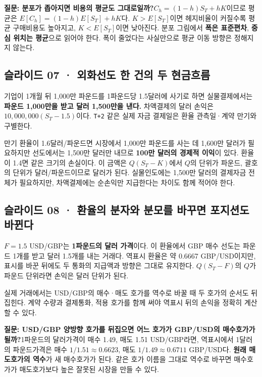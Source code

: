 \documentclass[11pt,a4paper]{article}
\begin{document}
\par\medskip\noindent\textbf{질문: 분포가 좁아지면 비용의 평균도 그대로일까?}\quad $C_h=(1-h)S_T+hK$이므로 평균은 $E[C_h]=(1-h)E[S_T]+hK$다. $K>E[S_T]$이면 헤지비율이 커질수록 평균 구매비용도 높아지고, $K<E[S_T]$이면 낮아진다. 분포 그림에서 \textbf{폭은 표준편차}, \textbf{중심 위치는 평균}으로 읽어야 한다. 폭이 줄었다는 사실만으로 평균 이동 방향은 정해지지 않는다.\par

\subsection{슬라이드 07 · 외화선도 한 건의 두 현금흐름}
기업이 1개월 뒤 1,000만 파운드를 1파운드당 1.5달러에 사기로 하면 실물결제에서는 \textbf{파운드 1,000만을 받고 달러 1,500만을 낸다.} 차액결제의 달러 손익은 $10{,}000{,}000(S_T-1.5)$이다. \texttt{T+2} 같은 실제 자금 결제일은 환율 관측일·계약 만기와 구별한다.\par

만기 환율이 1.6달러/파운드면 시장에서 1,000만 파운드를 사는 데 1,600만 달러가 필요하지만 선도에서는 1,500만 달러만 내므로 \textbf{100만 달러의 경제적 이익}이 있다. 환율이 1.4면 같은 크기의 손실이다. 이 금액은 $Q(S_T-K)$에서 $Q$의 단위가 파운드, 괄호의 단위가 달러/파운드이므로 달러가 된다. 실물인도에는 1,500만 달러의 결제자금 전체가 필요하지만, 차액결제에는 순손익만 지급한다는 차이도 함께 적어야 한다.\par

\subsection{슬라이드 08 · 환율의 분자와 분모를 바꾸면 포지션도 바뀐다}
$F=1.5$ USD/GBP는 \textbf{1파운드의 달러 가격}이다. 이 환율에서 GBP 매수 선도는 파운드 1개를 받고 달러 1.5개를 내는 거래다. 역표시 환율은 약 0.6667 GBP/USD이지만, 표시를 바꾼 뒤에도 두 통화의 지급액과 방향은 그대로 유지한다. $Q(S_T-F)$의 $Q$가 파운드 단위라면 손익은 달러 단위가 된다.\par

실제 거래에서는 USD/GBP의 매수·매도 호가를 역수로 바꿀 때 두 호가의 순서도 뒤집힌다. 계약 수량과 결제통화, 적용 호가를 함께 써야 역표시 뒤의 손익을 정확히 계산할 수 있다.\par

\par\medskip\noindent\textbf{질문: USD/GBP 양방향 호가를 뒤집으면 어느 호가가 GBP/USD의 매수호가가 될까?}\quad 1파운드의 달러가격이 매수 1.49, 매도 1.51 USD/GBP라면, 역표시에서 1달러의 파운드가격은 매수 $1/1.51\approx0.6623$, 매도 $1/1.49\approx0.6711$ GBP/USD다. \textbf{원래 매도호가의 역수}가 새 매수호가가 된다. 같은 호가 이름을 그대로 역수로 바꾸면 매수호가가 매도호가보다 높은 잘못된 시장을 만들 수 있다.\par
\end{document}
